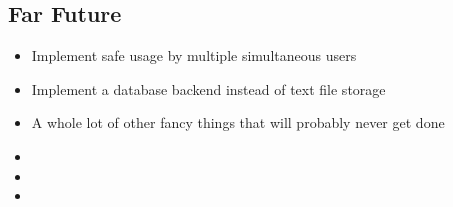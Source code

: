 \documentclass[letterpaper,10pt,english]{sphinxmanual}
\begin{document}
\subsection{Far Future}
\label{\detokenize{releases:far-future}}\begin{itemize}
\item {} 
\sphinxAtStartPar
Implement safe usage by multiple simultaneous users

\item {} 
\sphinxAtStartPar
Implement a database backend instead of text file storage

\item {} 
\sphinxAtStartPar
A whole lot of other fancy things that will probably never get done

\end{itemize}
\begin{itemize}
\item {} 
\sphinxAtStartPar
{}

\item {} 
\sphinxAtStartPar
{}

\item {} 
\sphinxAtStartPar
{}

\end{itemize}



\renewcommand{\indexname}{Index}
\printindex
\end{document}
